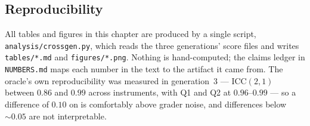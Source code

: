 \subsection{Reproducibility}
All tables and figures in this chapter are produced by a single script,
\texttt{analysis/crossgen.py}, which reads the three generations' score files and writes
\texttt{tables/*.md} and \texttt{figures/*.png}. Nothing is hand-computed; the claims ledger in
\texttt{NUMBERS.md} maps each number in the text to the artifact it came from. The oracle's own
reproducibility was measured in generation~3 --- $\mathrm{ICC}(2,1)$ between $0.86$ and $0.99$
across instruments, with Q1 and Q2 at $0.96$--$0.99$ --- so a difference of $0.10$ on \QQ{} is
comfortably above grader noise, and differences below ${\sim}0.05$ are not interpretable.
